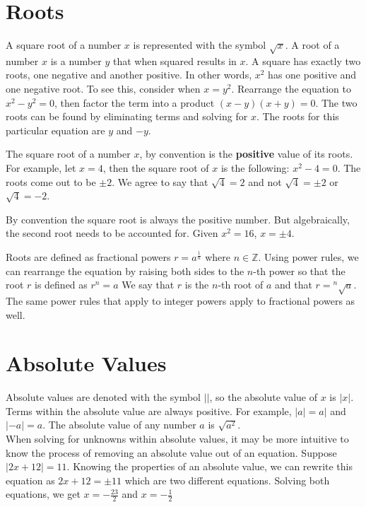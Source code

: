 \documentclass[12pt]{report}
\begin{document}
\section{Roots}

\hspace{\parindent}A square root of a number $x$ is represented with the symbol $\sqrt{x}$. A root of a number $x$ is a number $y$ that when squared results in $x$. A square has exactly two roots, one negative and another positive. In other words, $x^2$ has one positive and one negative root. To see this, consider when $x=y^2$. Rearrange the equation to $x^2-y^2=0$, then factor the term into a product $(x-y)(x+y)=0$. The two roots can be found by eliminating terms and solving for $x$. The roots for this particular equation are $y$ and $-y$.

The square root of a number $x$, by convention is the \textbf{positive} value of its roots. For example, let $x=4$, then the square root of $x$ is the following: $x^2-4=0$. The roots come out to be $\pm 2$. We agree to say that $\sqrt{4}=2$ and not $\sqrt{4}=\pm 2$ or $\sqrt{4}=-2$.

By convention the square root is always the positive number. But algebraically, the second root needs to be accounted for. Given $x^2=16$, $x=\pm 4$.\bigskip\\

Roots are defined as fractional powers $r=a^{\frac{1}{n}}$ where $n \in \mathbb{Z}$.
Using power rules, we can rearrange the equation by raising both sides to the $n$-th power so that the root $r$ is defined as $r^n=a$ We say that $r$ is the $n$-th root of $a$ and that $r={^{n}\sqrt{a}}$. The same power rules that apply to integer powers apply to fractional powers as well.

\section{Absolute Values}

\hspace{\parindent}Absolute values are denoted with the symbol $||$, so the absolute value of $x$ is $|x|$. Terms within the absolute value are always positive. For example, $|a|=a|$ and $|-a|=a$. The absolute value of any number $a$ is $\sqrt{a^2}$.\medskip\\
When solving for unknowns within absolute values, it may be more intuitive to know the process of removing an absolute value out of an equation. Suppose $|2x+12|=11$. Knowing the properties of an absolute value, we can rewrite this equation as $2x+12=\pm 11$ which are two different equations. Solving both equations, we get $x=-\frac{23}{2}$ and $x=-\frac{1}{2}$
\end{document}
